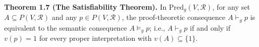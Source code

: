 \textbf{Theorem 1.7 (The Satisfiability Theorem).} In $\text{Pred}_g(V, \mathcal{R})$, for any set $A \subseteq P(V, \mathcal{R})$ and any $p \in P(V, \mathcal{R})$, the proof-theoretic consequence $A \vdash_g p$ is equivalent to the semantic consequence $A \vDash_g p$; i.e., $A \vdash_g p$ if and only if $v(p) = 1$ for every proper interpretation with $v(A) \subseteq \{1\}$.
